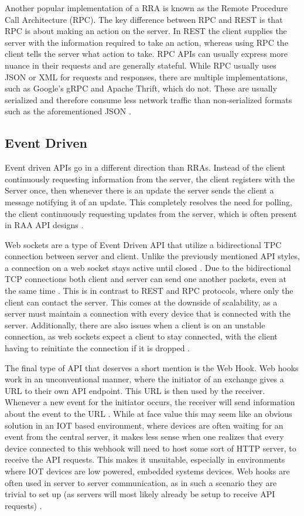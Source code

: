 Another popular implementation of a RRA is known as the Remote Procedure Call Architecture (RPC). The key difference between RPC and REST is that RPC is about making an action on the server. In REST the client supplies the server with the information required to take an action, whereas using RPC the client tells the server what action to take. RPC APIs can usually express more nuance in their requests and are generally stateful. While RPC usually uses JSON or XML for requests and responses, there are multiple implementations, such as Google's gRPC and Apache Thrift, which do not. These are usually serialized and therefore consume less network traffic than non-serialized formats such as the aforementioned JSON \cite{DesigningWebApis}. 

\subsection{Event Driven}
Event driven APIs go in a different direction than RRAs. Instead of the client continuously requesting information from the server, the client registers with the Server once, then whenever there is an update the server sends the client a message notifying it of an update. This completely resolves the need for polling, the client continuously requesting updates from the server, which is often present in RAA API designs \cite{DesigningWebApis}.

Web sockets are a type of Event Driven API that utilize a bidirectional TPC connection between server and client. Unlike the previously mentioned API styles, a connection on a web socket stays active until closed \cite{WebsocketStandard}. Due to the bidirectional TCP connections both client and server can send one another packets, even at the same time \cite{DesigningWebApis}. This is in contrast to REST and RPC protocols, where only the client can contact the server. This comes at the downside of scalability, as a server must maintain a connection with every device that is connected with the server. Additionally, there are also issues when a client is on an unstable connection, as web sockets expect a client to stay connected, with the client having to reinitiate the connection if it is dropped \cite{DesigningWebApis}.

The final type of API that deserves a short mention is the Web Hook. Web hooks work in an unconventional manner, where the initiator of an exchange gives a URL to their own API endpoint. This URL is then used by the receiver. Whenever a new event for the initiator occurs, the receiver will send information about the event to the URL \cite{DesigningWebApis}. While at face value this may seem like an obvious solution in an IOT based environment, where devices are often waiting for an event from the central server, it makes less sense when one realizes that every device connected to this webhook will need to host some sort of HTTP server, to receive the API requests. This makes it unsuitable, especially in environments where IOT devices are low powered, embedded systems devices. Web hooks are often used in server to server communication, as in such a scenario they are trivial to set up (as servers will most likely already be setup to receive API requests) \cite{DesigningWebApis}.

